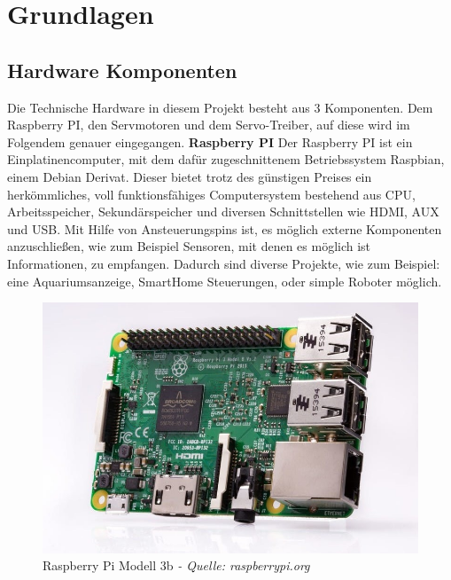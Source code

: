 \documentclass[12pt,					%
							 oneside,			%
							 a4paper,			%
							 halfparskip,		%
							 liststotoc,			%
							 bibtotoc,			%
							 fleqn,				%
							 pointlessnumbers]	%
							 {scrreprt}
\begin{document}
\chapter{Grundlagen}
\section{Hardware Komponenten}
Die Technische Hardware in diesem Projekt besteht aus 3 Komponenten. Dem Raspberry PI, den Servmotoren und dem Servo-Treiber, auf diese wird im Folgendem genauer eingegangen. \newline \newline
\textbf{Raspberry PI} \newline
Der Raspberry PI  ist ein Einplatinencomputer, mit dem dafür zugeschnittenem Betriebssystem \glqq{}Raspbian\grqq{}, einem Debian Derivat. Dieser bietet trotz des günstigen Preises ein herkömmliches, voll funktionsfähiges Computersystem bestehend aus CPU, Arbeitsspeicher, Sekundärspeicher und diversen Schnittstellen wie HDMI, AUX und USB. Mit Hilfe von Ansteuerungspins ist, es möglich externe Komponenten anzuschließen, wie zum Beispiel Sensoren, mit denen es möglich ist Informationen, zu empfangen. Dadurch sind diverse Projekte, wie zum Beispiel: eine Aquariumsanzeige, SmartHome Steuerungen, oder simple  \glqq{}Roboter \glqq{} möglich.\newline\newline
\begin{figure}[h!]
	\centering
	\includegraphics[scale=0.55]{pictures/raspberryPi3b.jpg}
	\caption{Raspberry Pi Modell 3b \textit{- Quelle: raspberrypi.org\cite{Foundation2020}}}
\end{figure}
\end{document}

